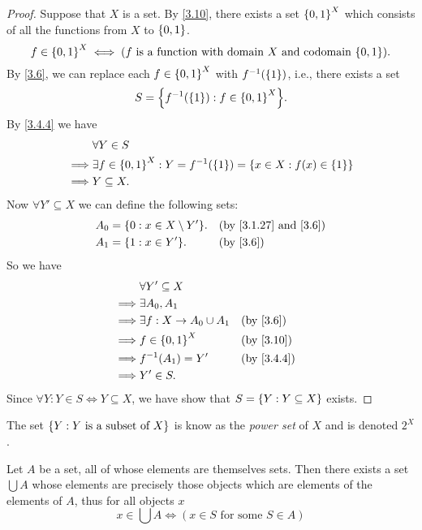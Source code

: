 \begin{proof}
  Suppose that \(X\) is a set.
  By \cref{3.10}, there exists a set \(\left\lbrace0, 1\right\rbrace^X\) which consists of all the functions from \(X\) to \(\left\lbrace0, 1\right\rbrace\).
  \[
    f \in \set{0, 1}^X \iff (f \text{ is a function with domain } X \text{ and codomain } \set{0, 1}).
  \]
  By \cref{3.6}, we can replace each \(f \in \left\lbrace0, 1\right\rbrace^X\) with \(f^{-1}(\left\lbrace1\right\rbrace)\), i.e., there exists a set
  \[
    S = \set{f^{-1}(\set{1}) : f \in \set{0, 1}^X}.
  \]
  By \cref{3.4.4} we have
  \begin{align*}
             & \forall Y \in S                                                                     \\
    \implies & \exists f \in \left\lbrace0, 1\right\rbrace^X : Y = f^{-1}(\left\lbrace1\right\rbrace) = \left\lbrace x \in X : f(x) \in \left\lbrace1\right\rbrace\right\rbrace \\
    \implies & Y \subseteq X.
  \end{align*}
  Now \(\forall Y' \subseteq X\) we can define the following sets:
  \begin{align*}
    A_0 & = \set{0 : x \in X \setminus Y'}. &  & \text{(by \cref{3.1.27} and \cref{3.6})} \\
    A_1 & = \set{1 : x \in Y'}.             &  & \by{3.6}
  \end{align*}
  So we have
  \begin{align*}
             & \forall Y' \subseteq X                         \\
    \implies & \exists A_0, A_1                               \\
    \implies & \exists f : X \to A_0 \cup A_1 &  & \by{3.6}   \\
    \implies & f \in \set{0, 1}^X             &  & \by{3.10}  \\
    \implies & f^{-1}(A_1) = Y'               &  & \by{3.4.4} \\
    \implies & Y' \in S.
  \end{align*}
  Since \(\forall Y : Y \in S \iff Y \subseteq X\), we have show that \(S = \left\lbrace Y : Y \subseteq X\right\rbrace\) exists.
\end{proof}

\begin{rmk}\label{3.4.10}
  The set \(\left\lbrace Y : Y \text{ is a subset of } X\right\rbrace\) is know as the \emph{power set} of \(X\) and is denoted \(2^X\).
\end{rmk}

\begin{ax}[Union]\label{3.11}
  Let \(A\) be a set, all of whose elements are themselves sets.
  Then there exists a set \(\bigcup A\) whose elements are precisely those objects which are elements of the elements of \(A\), thus for all objects \(x\)
  \[
    x \in \bigcup A \iff (x \in S \text{ for some } S \in A)
  \]
\end{ax}

